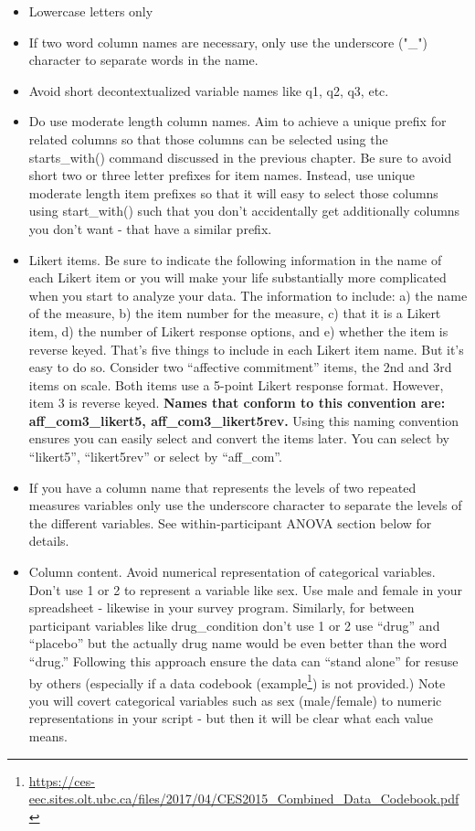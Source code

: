 \documentclass[
]{krantz}
\renewcommand{\href}[2]{#2\footnote{\url{#1}}}
\begin{document}
\begin{itemize}
\item
  Lowercase letters only
\item
  If two word column names are necessary, only use the underscore ("\_") character to separate words in the name.
\item
  Avoid short decontextualized variable names like q1, q2, q3, etc.
\item
  Do use moderate length column names. Aim to achieve a unique prefix for related columns so that those columns can be selected using the starts\_with() command discussed in the previous chapter. Be sure to avoid short two or three letter prefixes for item names. Instead, use unique moderate length item prefixes so that it will easy to select those columns using start\_with() such that you don't accidentally get additionally columns you don't want - that have a similar prefix.
\item
  Likert items. Be sure to indicate the following information in the name of each Likert item or you will make your life substantially more complicated when you start to analyze your data. The information to include: a) the name of the measure, b) the item number for the measure, c) that it is a Likert item, d) the number of Likert response options, and e) whether the item is reverse keyed. That's five things to include in each Likert item name. But it's easy to do so. Consider two ``affective commitment'' items, the 2nd and 3rd items on scale. Both items use a 5-point Likert response format. However, item 3 is reverse keyed. \textbf{Names that conform to this convention are: aff\_com3\_likert5, aff\_com3\_likert5rev.} Using this naming convention ensures you can easily select and convert the items later. You can select by ``likert5'', ``likert5rev'' or select by ``aff\_com''.
\item
  If you have a column name that represents the levels of two repeated measures variables only use the underscore character to separate the levels of the different variables. See within-participant ANOVA section below for details.
\item
  Column content. Avoid numerical representation of categorical variables. Don't use 1 or 2 to represent a variable like sex. Use male and female in your spreadsheet - likewise in your survey program. Similarly, for between participant variables like drug\_condition don't use 1 or 2 use ``drug'' and ``placebo'' but the actually drug name would be even better than the word ``drug.'' Following this approach ensure the data can ``stand alone'' for resuse by others (especially if a data codebook (\href{https://ces-eec.sites.olt.ubc.ca/files/2017/04/CES2015_Combined_Data_Codebook.pdf}{example}) is not provided.) Note you will covert categorical variables such as sex (male/female) to numeric representations in your script - but then it will be clear what each value means.
\end{itemize}
\end{document}
